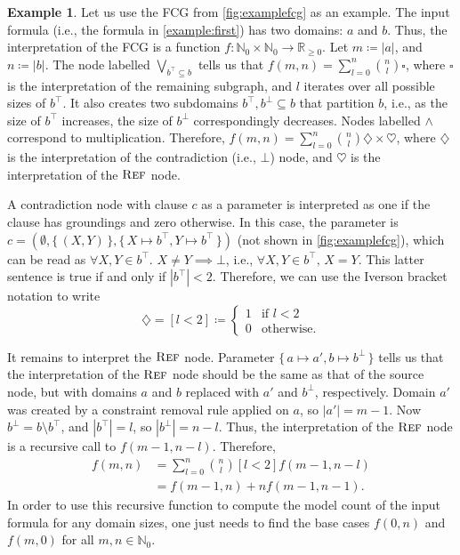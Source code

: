 \documentclass[letterpaper]{article} %
\DeclareMathOperator{\Reff}{\textsc{Ref}}
\theoremstyle{definition}
\newtheorem{example}{Example}
\theoremstyle{remark}
\begin{document}
\begin{example}\label{example:interpretation}
  Let us use the FCG from \cref{fig:examplefcg} as an example. The input formula
  (i.e., the formula in \cref{example:first}) has two domains: $a$ and $b$.
  Thus, the interpretation of the FCG is a function
  $f\colon \mathbb{N}_{0} \times \mathbb{N}_{0} \to \mathbb{R}_{\ge 0}$. Let
  $m \coloneqq |a|$, and $n \coloneqq |b|$. The node labelled
  $\bigvee_{b^{\top} \subseteq b}$ tells us that
  $f(m, n) = \sum_{l = 0}^{n} \binom{n}{l} \square$, where $\square$ is the
  interpretation of the remaining subgraph, and $l$ iterates over all possible
  sizes of $b^{\top}$. It also creates two subdomains
  $b^{\top}, b^{\bot} \subseteq b$ that partition $b$, i.e., as the size of
  $b^{\top}$ increases, the size of $b^{\bot}$ correspondingly decreases. Nodes
  labelled $\land$ correspond to multiplication. Therefore,
  $f(m, n) = \sum_{l = 0}^{n} \binom{n}{l} \diamondsuit \times \heartsuit$,
  where $\diamondsuit$ is the interpretation of the contradiction (i.e., $\bot$)
  node, and $\heartsuit$ is the interpretation of the $\Reff$ node.

  A contradiction node with clause $c$ as a parameter is interpreted as one if
  the clause has groundings and zero otherwise. In this case, the parameter is
  $c = (\emptyset, \{\, (X, Y) \,\}, \{\, X \mapsto b^\top, Y \mapsto b^\top \,\})$
  (not shown in \cref{fig:examplefcg}), which can be read as
  $\forall X, Y \in b^{\top}\text{. }X \ne Y \implies \bot$, i.e.,
  $\forall X, Y \in b^{\top}\text{, }X = Y$. This latter sentence is true if and
  only if $|b^{\top}| < 2$. Therefore, we can use the Iverson bracket notation
  to write
  \[
    \diamondsuit = [l < 2] \coloneqq
    \begin{cases}
      1 & \text{if } l < 2 \\
      0 & \text{otherwise.}
    \end{cases}
  \]

  It remains to interpret the $\Reff$ node. Parameter
  $\{\, a \mapsto a', b \mapsto b^\bot \,\}$ tells us that the interpretation of
  the $\Reff$ node should be the same as that of the source node, but with
  domains $a$ and $b$ replaced with $a'$ and $b^{\bot}$, respectively. Domain
  $a'$ was created by a constraint removal rule applied on $a$, so
  $|a'| = m - 1$. Now $b^{\bot} = b \setminus b^{\top}$, and $|b^{\top}| = l$,
  so $|b^{\bot}| = n - l$. Thus, the interpretation of the $\Reff$ node is a
  recursive call to $f(m - 1, n - l)$. Therefore,
  \begin{align}
    f(m, n) &= \sum_{l = 0}^{n} \binom{n}{l} [l < 2] f(m-1, n-l)\nonumber \\
            &= f(m-1, n) + n f(m-1, n-1).\label{eq:solution}
  \end{align}
  In order to use this recursive function to compute the model count of the
  input formula for any domain sizes, one just needs to find the base cases
  $f(0, n)$ and $f(m, 0)$ for all $m, n \in \mathbb{N}_{0}$.
\end{example}
\end{document}

